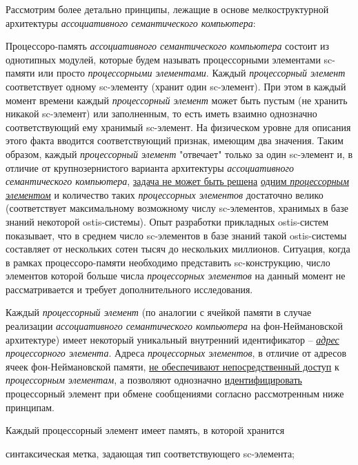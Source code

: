 Рассмотрим более детально принципы, лежащие в основе мелкоструктурной архитектуры \textit{ассоциативного семантического компьютера}:
\begin{textitemize}
	\item Процессоро-память \textit{ассоциативного семантического компьютера} состоит из однотипных модулей, которые будем называть процессорными элементами sc-памяти или просто \textit{процессорными элементами}. Каждый \textit{процессорный элемент} соответствует одному sc-элементу (хранит один sc-элемент). При этом в каждый момент времени каждый \textit{процессорный элемент} может быть пустым (не хранить никакой sc-элемент) или заполненным, то есть иметь взаимно однозначно соответствующий ему хранимый sc-элемент. На физическом уровне для описания этого факта вводится соответствующий признак, имеющим два значения. Таким образом, каждый \textit{процессорный элемент} "отвечает"{} только за один sc-элемент и, в отличие от крупнозернистого варианта архитектуры \textit{ассоциативного семантического компьютера}, \underline{задача не может быть решена} \underline{одним \textit{процессорным элементом}} и количество таких \textit{процессорных элементов} достаточно велико (соответствует максимальному возможному числу sc-элементов, хранимых в базе знаний некоторой ostis-системы). Опыт разработки прикладных ostis-систем показывает, что в среднем число sc-элементов в базе знаний такой ostis-системы составляет от нескольких сотен тысяч до нескольких миллионов. Ситуация, когда в рамках процессоро-памяти необходимо представить sc-конструкцию, число элементов которой больше числа \textit{процессорных элементов} на данный момент не рассматривается и требует дополнительного исследования.
	\item Каждый \textit{процессорный элемент} (по аналогии с ячейкой памяти в случае реализации \textit{ассоциативного семантического компьютера} на фон-Неймановской архитектуре) имеет некоторый уникальный внутренний идентификатор -- \textit{\underline{адрес} процессорного элемента}. Адреса \textit{процессорных элементов}, в отличие от адресов ячеек фон-Неймановской памяти, \underline{не обеспечивают непосредственный доступ} к \textit{процессорным элементам}, а позволяют однозначно \underline{идентифицировать} процессорный элемент при обмене сообщениями согласно рассмотренным ниже принципам.
	\item Каждый процессорный элемент имеет память, в которой хранится
	\begin{textitemize}
		\item синтаксическая метка, задающая тип соответствующего sc-элемента;

\end{textitemize}
\end{textitemize}
